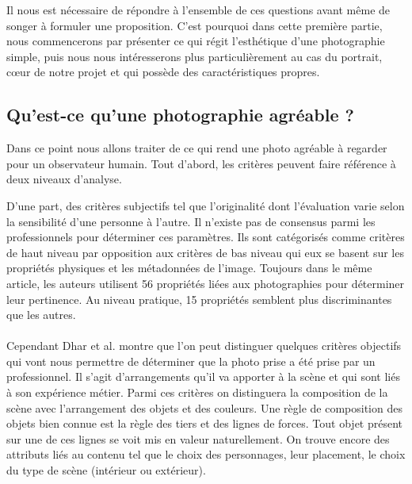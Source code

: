 \documentclass[11pt, french]{report-rd-info}
\begin{document}
Il nous est nécessaire de répondre à l’ensemble de ces questions avant même de songer à formuler une proposition. C’est pourquoi dans cette première partie, nous commencerons par présenter ce qui régit l'esthétique d’une photographie simple, puis nous nous intéresserons plus particulièrement au cas du portrait, cœur de notre projet et qui possède des caractéristiques propres.
\subsection{Qu’est-ce qu’une photographie agréable ?}
Dans ce point nous allons traiter de ce qui rend une photo agréable à regarder pour un observateur humain. Tout d’abord, les critères peuvent faire référence à deux niveaux d'analyse.

D’une part, des critères subjectifs tel que l’originalité \cite{Datta} dont l’évaluation varie selon la sensibilité d’une personne à l’autre. Il n’existe pas de consensus parmi les professionnels pour déterminer ces paramètres. Ils sont catégorisés comme critères de haut niveau par opposition aux critères de bas niveau qui eux se basent sur les propriétés physiques et les métadonnées de l’image. Toujours dans le même article, les auteurs utilisent 56 propriétés liées aux photographies pour déterminer leur pertinence. Au niveau pratique, 15 propriétés semblent plus discriminantes que les autres.
\paragraph*{}
Cependant Dhar et al. \cite{Dhar} montre que l’on peut distinguer quelques critères objectifs qui vont nous permettre de déterminer que la photo prise a été prise par un professionnel. Il s’agit  d’arrangements qu’il va apporter à la scène et qui sont liés à son expérience métier. Parmi ces critères on distinguera la composition de la scène avec l'arrangement des objets et des couleurs. Une règle de composition des objets bien connue est la règle des tiers et des lignes de forces. Tout objet présent sur une de ces lignes se voit mis en valeur naturellement. On trouve encore des attributs liés au contenu tel que le choix des personnages, leur placement, le choix du type de scène (intérieur ou extérieur). 
\end{document}
